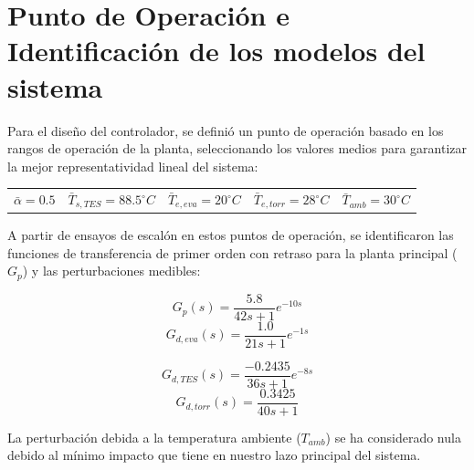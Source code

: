 \section{Punto de Operación e Identificación de los modelos del sistema}
\label{sec:pto-op}
	
	
	Para el diseño del controlador, se definió un punto de operación basado en los rangos de operación de la planta, seleccionando los valores medios para garantizar la mejor representatividad lineal del sistema:
	
	\begin{center}
		\small
		\begin{tabular}{ccccc}
			$\bar{\alpha} = 0.5$ & $\bar{T}_{s,TES} = 88.5^\circ C$ & $\bar{T}_{e,eva} = 20^\circ C$ & $\bar{T}_{e,torr} = 28^\circ C$ & $\bar{T}_{amb} = 30^\circ C$ \\
		\end{tabular}
	\end{center}
	
	A partir de ensayos de escalón en estos puntos de operación, se identificaron las funciones de transferencia de primer orden con retraso para la planta principal ($G_p$) y las perturbaciones medibles:
	
	\begin{minipage}{0.48\textwidth}
		\small
		\begin{equation*}
			G_p(s) = \frac{5.8}{42s+1}e^{-10s} 
		\end{equation*}
		\begin{equation*}
			G_{d,eva}(s) = \frac{1.0}{21s+1}e^{-1s}
		\end{equation*}
	\end{minipage}
	\hfill
	\begin{minipage}{0.48\textwidth}
		\small
		\begin{equation*}
			G_{d,TES}(s) = \frac{-0.2435}{36s+1}e^{-8s}
		\end{equation*}
		\begin{equation*}
			G_{d,torr}(s) = \frac{0.3425}{40s+1}
		\end{equation*}
	\end{minipage}
		\vspace{0.5em}
		
	La perturbación debida a la temperatura ambiente ($T_{amb}$) se ha considerado nula debido al mínimo impacto que tiene en nuestro lazo principal del sistema. \\
	

